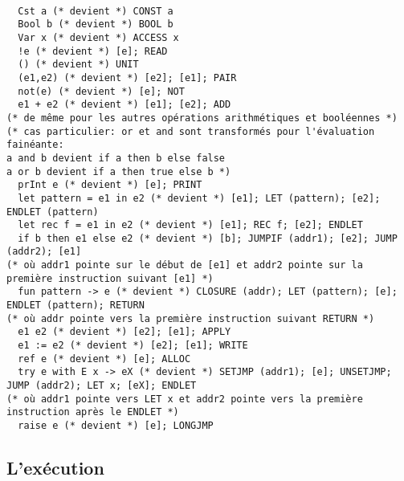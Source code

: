 \documentclass{article}
\begin{document}
\begin{verbatim}

  Cst a (* devient *) CONST a
  Bool b (* devient *) BOOL b
  Var x (* devient *) ACCESS x
  !e (* devient *) [e]; READ
  () (* devient *) UNIT
  (e1,e2) (* devient *) [e2]; [e1]; PAIR
  not(e) (* devient *) [e]; NOT
  e1 + e2 (* devient *) [e1]; [e2]; ADD
(* de même pour les autres opérations arithmétiques et booléennes *)
(* cas particulier: or et and sont transformés pour l'évaluation fainéante: 
a and b devient if a then b else false
a or b devient if a then true else b *)
  prInt e (* devient *) [e]; PRINT
  let pattern = e1 in e2 (* devient *) [e1]; LET (pattern); [e2]; ENDLET (pattern)
  let rec f = e1 in e2 (* devient *) [e1]; REC f; [e2]; ENDLET
  if b then e1 else e2 (* devient *) [b]; JUMPIF (addr1); [e2]; JUMP (addr2); [e1]
(* où addr1 pointe sur le début de [e1] et addr2 pointe sur la première instruction suivant [e1] *)
  fun pattern -> e (* devient *) CLOSURE (addr); LET (pattern); [e]; ENDLET (pattern); RETURN
(* où addr pointe vers la première instruction suivant RETURN *)
  e1 e2 (* devient *) [e2]; [e1]; APPLY
  e1 := e2 (* devient *) [e2]; [e1]; WRITE
  ref e (* devient *) [e]; ALLOC
  try e with E x -> eX (* devient *) SETJMP (addr1); [e]; UNSETJMP; JUMP (addr2); LET x; [eX]; ENDLET
(* où addr1 pointe vers LET x et addr2 pointe vers la première instruction après le ENDLET *)
  raise e (* devient *) [e]; LONGJMP

\end{verbatim}

\subsection{L'exécution}
\end{document}
